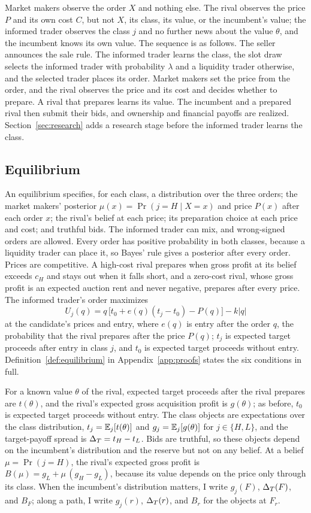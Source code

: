 Market makers observe the order \(X\) and nothing else. The rival observes the price \(P\) and its own
cost \(C\), but not \(X\), its class, its value, or the incumbent's value; the informed trader observes the class
\(j\) and no further news about the value \(\theta\), and the incumbent knows its own value. The sequence is as follows. The
seller announces the sale rule. The informed trader learns the class, the slot draw selects the informed trader with
probability \(\lambda\) and a liquidity trader otherwise, and the selected trader places its order. Market
makers set the price from the order, and the rival observes the price and its cost and decides whether
to prepare. A rival that prepares learns its value. The incumbent and a prepared rival then submit their bids, and
ownership and financial payoffs are realized. Section~\ref{sec:research} adds a research stage before the informed trader learns the class.

\subsection{Equilibrium}\label{sec:equilibrium}

An equilibrium specifies, for each class, a distribution over the three orders; the market makers' posterior
\(\mu(x)=\Pr(j=H\mid X=x)\) and price \(P(x)\) after each order \(x\); the rival's belief at each
price; its preparation choice at each price and cost; and truthful bids. The informed trader can mix, and
wrong-signed orders are allowed. Every order has positive probability in both classes, because a liquidity
trader can place it, so Bayes' rule gives a posterior after every order. Prices are competitive. A
high-cost rival prepares when gross profit at its belief exceeds \(c_H\) and stays out when it falls
short, and a zero-cost rival, whose gross profit is an expected auction rent and never negative,
prepares after every price. The informed trader's order maximizes
\[
U_j(q)=q\,\bigl[t_0+e(q)(t_j-t_0)-P(q)\bigr]-k|q|
\]
at the candidate's prices and entry, where \(e(q)\) is entry after the order \(q\), the probability that
the rival prepares after the price \(P(q)\); \(t_j\) is expected target proceeds after entry in class
\(j\), and \(t_0\) is expected target proceeds without entry. Definition~\ref{def:equilibrium} in
Appendix~\ref{app:proofs} states the six conditions in full.

For a known value \(\theta\) of the rival, expected target proceeds after the rival prepares are
\(t(\theta)\), and the rival's expected gross acquisition profit is \(g(\theta)\); as before, \(t_0\)
is expected target proceeds without entry. The class objects are expectations over the class distribution,
\(t_j=\mathbb{E}_j[t(\theta)]\) and \(g_j=\mathbb{E}_j[g(\theta)]\) for \(j\in\{H,L\}\), and the target-payoff spread is
\(\Delta_T=t_H-t_L\). Bids are truthful, so these objects depend on the incumbent's distribution and the reserve
but not on any belief. At a belief \(\mu=\Pr(j=H)\), the rival's expected gross profit is
\(B(\mu)=g_L+\mu\,(g_H-g_L)\), because its value depends on the price only through its class. When the
incumbent's distribution matters, I write \(g_j(F)\), \(\Delta_T(F)\), and \(B_F\); along a path, I write
\(g_j(r)\), \(\Delta_T(r)\), and \(B_r\) for the objects at \(F_r\).

